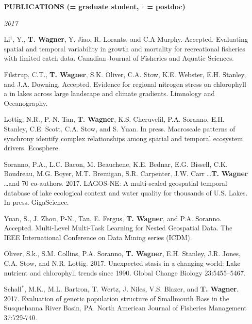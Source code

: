 \documentclass[10pt]{article}
\begin{document}
\begin{flushleft}
\vspace{8pt}
\centerline {\bf{PUBLICATIONS ({\small * = graduate student, $\dagger$ = postdoc})}}
\vspace{5pt}
\emph{2017}
\begin{etaremune}[start=72]
\item Li$^\dagger$, Y., {\bf T. Wagner}, Y. Jiao, R. Lorants, and C.A Murphy. Accepted. Evaluating spatial and temporal variability in growth and mortality for recreational fisheries with limited catch data. Canadian Journal of Fisheries and Aquatic Sciences.

\item Filstrup, C.T., {\bf T. Wagner}, S.K. Oliver, C.A. Stow, K.E. Webster, E.H. Stanley, and J.A. Downing. Accepted. Evidence for regional nitrogen stress on chlorophyll a in lakes across large landscape and climate gradients. Limnology and Oceanography.

\item Lottig, N.R., P.-N. Tan, {\bf T. Wagner}, K.S. Cheruvelil, P.A. Soranno, E.H. Stanley, C.E. Scott, C.A. Stow, and S. Yuan. In press. Macroscale patterns of synchrony identify complex relationships among spatial and temporal ecosystem drivers. Ecosphere.

\item Soranno, P.A., L.C. Bacon, M. Beauchene, K.E. Bednar, E.G. Bissell, C.K. Boudreau, M.G. Boyer, M.T. Bremigan, S.R. Carpenter, J.W. Carr \ldots  {\bf T. Wagner} \ldots  and 70 co-authors. 2017. LAGOS-NE: A multi-scaled geospatial temporal database of lake ecological context and water quality for thousands of U.S. Lakes. In press. GigaScience.

\item Yuan, S., J. Zhou, P-N., Tan, E. Fergus, {\bf T. Wagner}, and P.A. Soranno. Accepted. Multi-Level Multi-Task Learning for Nested Geospatial Data. The IEEE International Conference on Data Mining series (ICDM).

\item Oliver, S.k., S.M. Collins, P.A. Soranno, {\bf T. Wagner}, E.H. Stanley, J.R. Jones, C.A. Stow, and N.R. Lottig. 2017. Unexpected stasis in a changing world: Lake nutrient and chlorophyll trends since 1990. Global Change Biology 23:5455–5467.

\item Schall$^*$, M.K., M.L. Bartron, T. Wertz, J. Niles, V.S. Blazer, and {\bf T. Wagner}. 2017. Evaluation of genetic population structure of Smallmouth Bass in the Susquehanna River Basin, PA. North American Journal of Fisheries Management 37:729-740.


\end{etaremune}
\end{flushleft}
\end{document}
